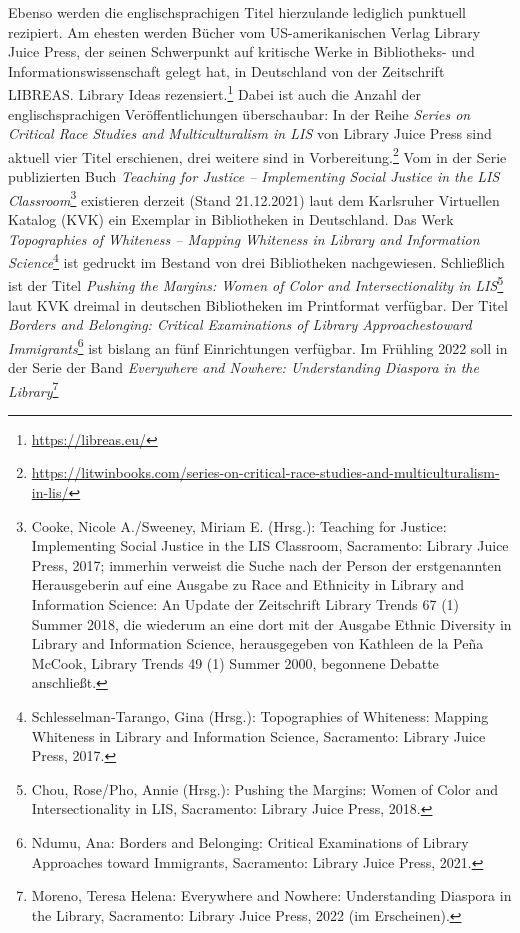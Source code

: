 \documentclass[a4paper,
fontsize=11pt,
oneside,
numbers=noperiodatend,
parskip=half-,
bibliography=totoc,
final
]{scrartcl}
\begin{document}
Ebenso werden die englischsprachigen Titel hierzulande lediglich
punktuell rezipiert. Am ehesten werden Bücher vom US-amerikanischen
Verlag Library Juice Press, der seinen Schwerpunkt auf kritische Werke
in Bibliotheks- und Informationswissenschaft gelegt hat, in Deutschland
von der Zeitschrift LIBREAS. Library Ideas rezensiert.\footnote{\url{https://libreas.eu/}}
Dabei ist auch die Anzahl der englischsprachigen Veröffentlichungen
überschaubar: In der Reihe \emph{Series on Critical Race Studies and
Multiculturalism in LIS} von Library Juice Press sind aktuell vier Titel
erschienen, drei weitere sind in Vorbereitung.\footnote{\url{https://litwinbooks.com/series-on-critical-race-studies-and-multiculturalism-in-lis/}}
Vom in der Serie publizierten Buch \emph{Teaching for Justice --
Implementing Social Justice in the LIS Classroom}\footnote{Cooke, Nicole
  A./Sweeney, Miriam E. (Hrsg.): Teaching for Justice: Implementing
  Social Justice in the LIS Classroom, Sacramento: Library Juice Press,
  2017; immerhin verweist die Suche nach der Person der erstgenannten
  Herausgeberin auf eine Ausgabe zu Race and Ethnicity in Library and
  Information Science: An Update der Zeitschrift Library Trends 67 (1)
  Summer 2018, die wiederum an eine dort mit der Ausgabe Ethnic
  Diversity in Library and Information Science, herausgegeben von
  Kathleen de la Peña McCook, Library Trends 49 (1) Summer 2000,
  begonnene Debatte anschließt.} existieren derzeit (Stand 21.12.2021)
laut dem Karlsruher Virtuellen Katalog (KVK) ein Exemplar in
Bibliotheken in Deutschland. Das Werk \emph{Topographies of Whiteness --
Mapping Whiteness in Library and Information Science}\footnote{Schlesselman-Tarango,
  Gina (Hrsg.): Topographies of Whiteness: Mapping Whiteness in Library
  and Information Science\emph{,} Sacramento: Library Juice Press, 2017.}
ist gedruckt im Bestand von drei Bibliotheken nachgewiesen. Schließlich
ist der Titel \emph{Pushing the Margins: Women of Color and
Intersectionality in LIS}\footnote{Chou, Rose/Pho, Annie (Hrsg.):
  Pushing the Margins: Women of Color and Intersectionality in LIS,
  Sacramento: Library Juice Press, 2018.} laut KVK dreimal in deutschen
Bibliotheken im Printformat verfügbar. Der Titel \emph{Borders and
Belonging: Critical Examinations of Library Approachestoward
Immigrants}\footnote{Ndumu, Ana: Borders and Belonging: Critical
  Examinations of Library Approaches toward Immigrants, Sacramento:
  Library Juice Press, 2021.} ist bislang an fünf Einrichtungen
verfügbar. Im Frühling 2022 soll in der Serie der Band \emph{Everywhere
and Nowhere: Understanding Diaspora in the Library}\footnote{Moreno,
  Teresa Helena: Everywhere and Nowhere: Understanding Diaspora in the
  Library, Sacramento: Library Juice Press, 2022 (im Erscheinen).}
\end{document}
